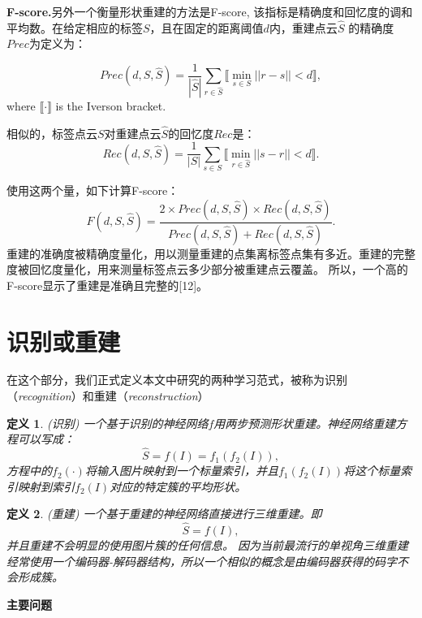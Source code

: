 \documentclass[bachelor, nocolorlinks, printoneside]{seuthesis} %
\newtheorem{theorem}{定义}
\begin{document}
\begin{Main}
\noindent
\textbf{F-score.}另外一个衡量形状重建的方法是F-score, 该指标是精确度和回忆度的调和平均数。在给定相应的标签$S$，且在固定的距离阈值$d$内，重建点云$\widehat{S}$
的精确度$\textit{Prec}$为定义为：

\begin{equation} \label{eq:precision}
\textit{Prec}(\textit{d}, S, \widehat{S}) = \frac{1}{|\widehat{S}|} \sum_{r \in \widehat{S}} \llbracket \min_{s \in S} ||r-s || < \textit{d} \rrbracket,
\end{equation}
where $\llbracket \cdot \rrbracket$ is the Iverson bracket.
    
相似的，标签点云$S$对重建点云$\widehat{S}$的回忆度$\textit{Rec}$是：
\begin{equation} \label{eq:recall}
    \textit{Rec}(\textit{d}, S, \widehat{S}) = \frac{1}{|S|} \sum_{s \in S} \llbracket \min_{r \in \widehat{S}} ||s-r || < \textit{d} \rrbracket.
    \end{equation}

使用这两个量，如下计算F-score：
\begin{equation} \label{eq:f-score}
    \textit{F}(\textit{d}, S, \widehat{S}) = \frac{2 \times \textit{Prec}(\textit{d}, S, \widehat{S})\times \textit{Rec}(\textit{d}, S, \widehat{S})}{\textit{Prec}(\textit{d}, S, \widehat{S}) + \textit{Rec}(\textit{d}, S, \widehat{S})}.
\end{equation}
重建的准确度被精确度量化，用以测量重建的点集离标签点集有多近。重建的完整度被回忆度量化，用来测量标签点云多少部分被重建点云覆盖。
所以，一个高的F-score显示了重建是准确且完整的[12]。
\section{识别或重建}
在这个部分，我们正式定义本文中研究的两种学习范式，被称为识别（\emph{recognition}）和重建（\emph{reconstruction}）

\begin{theorem}\label{def:recognition}(识别)
    一个基于识别的神经网络$f$用两步预测形状重建。神经网络重建方程可以写成：
\begin{equation}
        \widehat{S} = f(I) = f_1(f_2(I)),
\end{equation}
方程中的$f_2(\cdot)$将输入图片映射到一个标量索引，并且$f_1(f_2(I))$将这个标量索引映射到索引$f_2(I)$对应的特定簇的平均形状。
\end{theorem}

\begin{theorem}\label{def:reconstruction}(重建)
    一个基于重建的神经网络直接进行三维重建。即\begin{equation}
        \widehat{S} = f(I),
    \end{equation}
并且重建不会明显的使用图片簇的任何信息。
因为当前最流行的单视角三维重建经常使用一个编码器-解码器结构，所以一个相似的概念是由编码器获得的码字不会形成簇。
\end{theorem}
\textbf{主要问题}


\end{Main}
\end{document}
